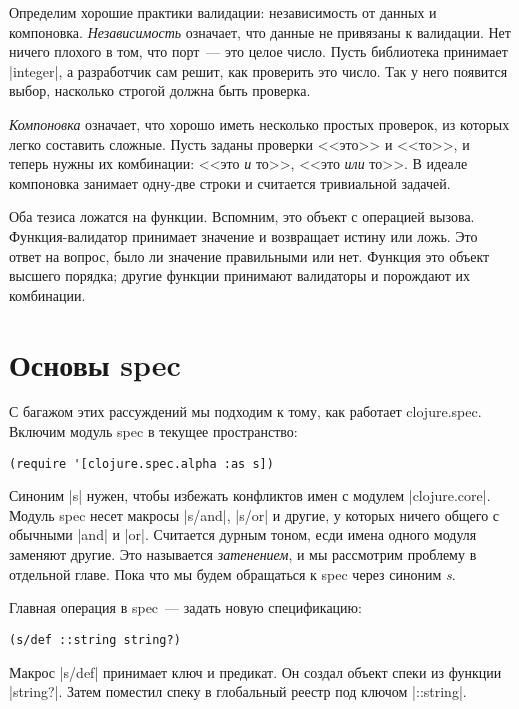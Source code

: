 Определим хорошие практики валидации: независимость от данных и
компоновка. \emph{Независимость} означает, что данные не привязаны к
валидации. Нет ничего плохого в том, что порт~--- это целое число. Пусть
библиотека принимает \spverb|integer|, а разработчик сам решит, как проверить
это число. Так у него появится выбор, насколько строгой должна быть проверка.

\emph{Компоновка} означает, что хорошо иметь несколько простых проверок, из
которых легко составить сложные. Пусть заданы проверки <<это>> и <<то>>,
и теперь нужны их комбинации: <<это \emph{и} то>>, <<это \emph{или} то>>.
В идеале компоновка занимает одну-две строки и считается тривиальной задачей.

Оба тезиса ложатся на функции. Вспомним, это объект с операцией
вызова. Функция-валидатор принимает значение и возвращает истину или ложь. Это
ответ на вопрос, было ли значение правильными или нет. Функция это объект
высшего порядка; другие функции принимают валидаторы и порождают их комбинации.


\section{Основы spec}

С багажом этих рассуждений мы подходим к тому, как работает
clojure.spec. Включим модуль spec в текущее пространство:

\begin{verbatim}
(require '[clojure.spec.alpha :as s])
\end{verbatim}

Синоним \spverb|s| нужен, чтобы избежать конфликтов имен с модулем
\spverb|clojure.core|. Модуль spec несет макросы \spverb|s/and|, \spverb|s/or|
и другие, у которых ничего общего с обычными \spverb|and| и \spverb|or|. Считается
дурным тоном, есди имена одного модуля заменяют другие. Это называется \emph{затенением},
и мы рассмотрим проблему в отдельной главе. Пока что мы будем обращаться к spec
через синоним \emph{s}.

Главная операция в spec~--- задать новую спецификацию:

\begin{verbatim}
(s/def ::string string?)
\end{verbatim}

Макрос \spverb|s/def| принимает ключ и предикат. Он создал объект спеки из функции
\spverb|string?|. Затем поместил спеку в глобальный реестр под ключом \spverb|::string|.

